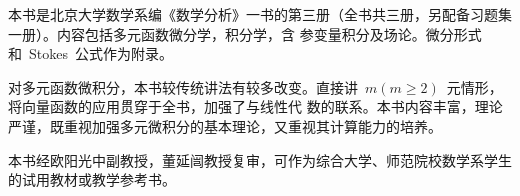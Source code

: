 

\begin{summary}
本书是北京大学数学系编《数学分析》一书的第三册（全书共三册，另配备习题集一册）。内容包括多元函数微分学，积分学，含
参变量积分及场论。微分形式和~Stokes~公式作为附录。

对多元函数微积分，本书较传统讲法有较多改变。直接讲~$m(m\geq 2)$~元情形，将向量函数的应用贯穿于全书，加强了与线性代
数的联系。本书内容丰富，理论严谨，既重视加强多元微积分的基本理论，又重视其计算能力的培养。

本书经欧阳光中副教授，董延闿教授复审，可作为综合大学、师范院校数学系学生的试用教材或教学参考书。
\end{summary}

\MakeVolume*

\volfrontmatter



\VolumeTOC

\volmainmatter











\begin{appendix}

\end{appendix}

\endinput
